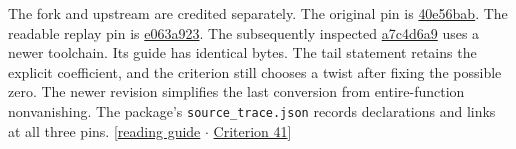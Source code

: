 \documentclass[12pt,letterpaper]{article}
\newcommand{\id}[1]{{\small\nolinkurl{#1}}}
\begin{document}
The fork and upstream are credited separately. The original pin is \href{https://github.com/nousentllc/riemann-hypothesis/tree/40e56bab026552e089d7afcfeff08d2defb9c005}{40e56bab}. The readable replay pin is \href{https://github.com/leanprover-community/riemann-hypothesis/tree/e063a923620ee7787b4a1270421478645bf66bdb}{e063a923}. The subsequently inspected \href{https://github.com/leanprover-community/riemann-hypothesis/tree/a7c4d6a94945f49da752e237a6b1e944ab62677e}{a7c4d6a9} uses a newer toolchain. Its guide has identical bytes. The tail statement retains the explicit coefficient, and the criterion still chooses a twist after fixing the possible zero. The newer revision simplifies the last conversion from entire-function nonvanishing. The package's \id{source_trace.json} records declarations and links at all three pins. {\small\sffamily\color{mute}[\href{https://github.com/leanprover-community/riemann-hypothesis/blob/a7c4d6a94945f49da752e237a6b1e944ab62677e/GUIDE.md#L1}{reading guide} $\cdot$ \href{https://github.com/leanprover-community/riemann-hypothesis/blob/a7c4d6a94945f49da752e237a6b1e944ab62677e/src/New/Reduction/Zeros/Criterion.lean#L41}{Criterion 41}]}
\end{document}
